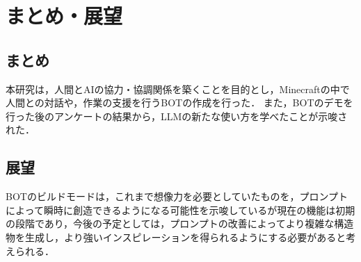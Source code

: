 \chapter{まとめ・展望}	%
\thispagestyle{plain}   %

\section{まとめ}
本研究は，人間とAIの協力・協調関係を築くことを目的とし，Minecraftの中で人間との対話や，作業の支援を行うBOTの作成を行った．
また，BOTのデモを行った後のアンケートの結果から，LLMの新たな使い方を学べたことが示唆された．

\section{展望}
BOTのビルドモードは，これまで想像力を必要としていたものを，プロンプトによって瞬時に創造できるようになる可能性を示唆しているが現在の機能は初期の段階であり，今後の予定としては，プロンプトの改善によってより複雑な構造物を生成し，より強いインスピレーションを得られるようにする必要があると考えられる．